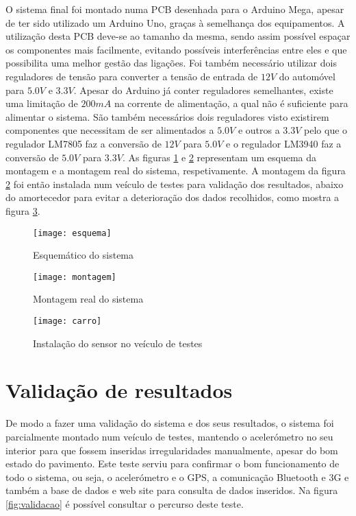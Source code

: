 O sistema final foi montado numa PCB desenhada para o Arduino Mega, apesar de ter sido utilizado um Arduino Uno, graças à semelhança dos equipamentos.
A utilização desta PCB deve-se ao tamanho da mesma, sendo assim possível espaçar os componentes mais facilmente, evitando possíveis interferências entre eles e que possibilita uma melhor gestão das ligações.
Foi também necessário utilizar dois reguladores de tensão para converter a tensão de entrada de $12 V$ do automóvel para $5.0 V$ e $3.3 V$.
Apesar do Arduino já conter reguladores semelhantes, existe uma limitação de $200 mA$ na corrente de alimentação, a qual não é suficiente para alimentar o sistema.
São também necessários dois reguladores visto existirem componentes que necessitam de ser alimentados a $5.0 V$ e outros a $3.3 V$ pelo que o regulador LM7805 faz a conversão de $12 V$ para $5.0 V$ e o regulador LM3940 faz a conversão de $5.0 V$ para $3.3 V$.
As figuras \ref{fig:esquematico_do_sistema} e \ref{fig:montagem_real_do_sistema} representam um esquema da montagem e a montagem real do sistema, respetivamente.
A montagem da figura \ref{fig:montagem_real_do_sistema} foi então instalada num veículo de testes para validação dos resultados, abaixo do amortecedor para evitar a deterioração dos dados recolhidos, como mostra a figura \ref{fig:carro}.

\begin{figure}[htbp]
	\centering
	\texttt{[image: esquema]}
	\caption{Esquemático do sistema}
	\label{fig:esquematico_do_sistema}
\end{figure}

\begin{figure}[htbp]
	\centering
	\texttt{[image: montagem]}
	\caption{Montagem real do sistema}
	\label{fig:montagem_real_do_sistema}
\end{figure}

\begin{figure}[htbp]
	\centering
	\texttt{[image: carro]}
	\caption{Instalação do sensor no veículo de testes}
	\label{fig:carro}
\end{figure}

\section{Validação de resultados}
\label{sec:validacao}

De modo a fazer uma validação do sistema e dos seus resultados, o sistema foi parcialmente montado num veículo de testes, mantendo o acelerómetro no seu interior para que fossem inseridas irregularidades manualmente, apesar do bom estado do pavimento.
Este teste serviu para confirmar o bom funcionamento de todo o sistema, ou seja, o acelerómetro e o GPS, a comunicação Bluetooth e 3G e também a base de dados e web site para consulta de dados inseridos.
Na figura \ref{fig:validacao} é possível consultar o percurso deste teste.

